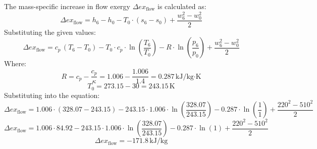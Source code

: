 The mass-specific increase in flow exergy \( \Delta ex_{\text{flow}} \) is calculated as:  
\[
\Delta ex_{\text{flow}} = h_6 - h_0 - T_0 \cdot (s_6 - s_0) + \frac{w_6^2 - w_0^2}{2}
\]  
Substituting the given values:  
\[
\Delta ex_{\text{flow}} = c_p \, (T_6 - T_0) - T_0 \cdot c_p \cdot \ln\left(\frac{T_6}{T_0}\right) - R \cdot \ln\left(\frac{p_6}{p_0}\right) + \frac{w_6^2 - w_0^2}{2}
\]  
Where:  
\[
R = c_p - \frac{c_p}{\kappa} = 1.006 - \frac{1.006}{1.4} = 0.287 \, \text{kJ/kg·K}
\]  
\[
T_0 = 273.15 - 30 = 243.15 \, \text{K}
\]  
Substituting into the equation:  
\[
\Delta ex_{\text{flow}} = 1.006 \cdot (328.07 - 243.15) - 243.15 \cdot 1.006 \cdot \ln\left(\frac{328.07}{243.15}\right) - 0.287 \cdot \ln\left(\frac{1}{1}\right) + \frac{220^2 - 510^2}{2}
\]  
\[
\Delta ex_{\text{flow}} = 1.006 \cdot 84.92 - 243.15 \cdot 1.006 \cdot \ln\left(\frac{328.07}{243.15}\right) - 0.287 \cdot \ln(1) + \frac{220^2 - 510^2}{2}
\]  
\[
\Delta ex_{\text{flow}} = -171.8 \, \text{kJ/kg}
\]